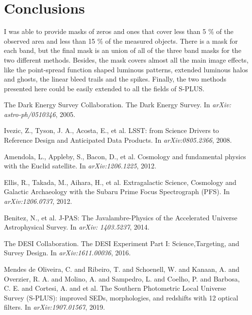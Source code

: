 \documentclass{article}
\begin{document}
\section{Conclusions}
\label{sec:conclusions}

I was able to provide masks of zeros and ones that cover less than 5 \% of the observed area and less than 15 \% of the measured objects. There is a mask for each band, but the final mask is an union of all of the three band masks for the two different methods. Besides, the mask covers almost all the main image effects, like the point-spread function shaped luminous patterns, extended luminous halos and ghosts, the linear bleed trails and the spikes. Finally, the two methods presented here could be easily extended to all the fields of S-PLUS.

\begin{thebibliography}{1}
  
	The Dark Energy Survey Collaboration.
	\newblock The Dark Energy Survey.
	\newblock In {\em arXiv: astro-ph/0510346}, 2005.

	Ivezic, Z., Tyson, J. A., Acosta, E., et al.
	\newblock LSST: from Science Drivers to Reference Design and Anticipated Data Products.
	\newblock In {\em arXiv:0805.2366}, 2008.

	Amendola, L., Appleby, S., Bacon, D., et al.
	\newblock Cosmology and fundamental physics with the Euclid satellite.
	\newblock In {\em arXiv:1206.1225}, 2012.

	Ellis, R., Takada, M., Aihara, H., et al.
	\newblock Extragalactic Science, Cosmology and Galactic Archaeology with the Subaru Prime Focus Spectrograph (PFS).
	\newblock In {\em arXiv:1206.0737}, 2012.

	Benitez, N., et al.
	\newblock J-PAS: The Javalambre-Physics of the Accelerated Universe Astrophysical Survey.
	\newblock In {\em arXiv: 1403.5237}, 2014.

	The DESI Collaboration.
	\newblock The DESI Experiment Part I: Science,Targeting, and Survey Design.
	\newblock In {\em arXiv:1611.00036}, 2016.

	Mendes de Oliveira, C. and Ribeiro, T. and Schoenell, W. and Kanaan, A. and Overzier, R. A. and Molino, A. and Sampedro, L. and Coelho, P. and Barbosa, C. E. and Cortesi, A. and et al.
	\newblock The Southern Photometric Local Universe Survey (S-PLUS): improved SEDs, morphologies, and redshifts with 12 optical filters.
	\newblock In {\em arXiv:1907.01567}, 2019.


\end{thebibliography}
\end{document}
